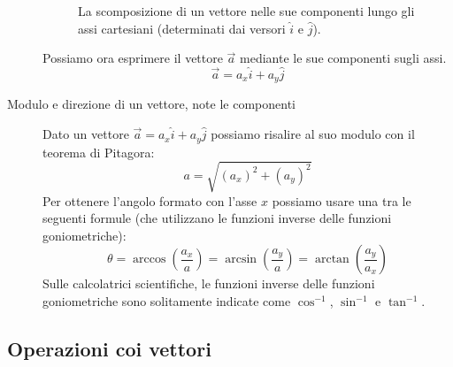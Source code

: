 \documentclass[a4paper,11pt,italian]{article}
\begin{document}
\begin{description}
    \begin{figure}[htb]\centering
    \caption{La scomposizione di un vettore nelle sue componenti lungo gli assi cartesiani (determinati dai versori $ \hat{i} $ e $ \hat{j} $).}
    \end{figure}
  
  
  Possiamo ora esprimere il vettore $ \vec{a} $ mediante le sue componenti sugli assi.
  \[ \vec{a} = a_x \hat{i} + a_y \hat{j} \]
  
  \item[Modulo e direzione di un vettore, note le componenti]
  Dato un vettore $ \vec{a} = a_x \hat{i} + a_y \hat{j}  $ possiamo risalire al suo modulo con il teorema di Pitagora:
  \[ a = \sqrt{(a_x)^2 + (a_y)^2} \]
  Per ottenere l'angolo  formato con l'asse $ x $ possiamo usare una tra le seguenti formule (che utilizzano le funzioni inverse delle funzioni goniometriche):
  \[ \theta  = \arccos\left( \frac{a_x}{a} \right) = \arcsin\left( \frac{a_y}{a} \right) = \arctan\left( \frac{a_y}{a_x} \right) \]
  Sulle calcolatrici scientifiche, le funzioni inverse delle funzioni goniometriche sono solitamente indicate come $ \cos^{-1} $, $ \sin^{-1} $ e $ \tan^{-1} $.
\end{description}

\subsection{Operazioni coi vettori}
\end{document}
